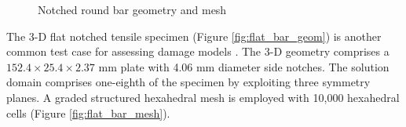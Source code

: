 \documentclass[sn-mathphys,Numbered]{sn-jnl}%
\begin{document}
\begin{figure}[htbp]
	\centering
		 \quad
		
		
		\caption{Notched round bar geometry and mesh}
	\label{fig:notched_bar_geom_mesh}
\end{figure}


The 3-D flat notched tensile specimen (Figure \ref{fig:flat_bar_geom}) is another common test case for assessing damage models \citep{borden_phase-field_2016, eldahshan_phase_2021}.
The 3-D geometry comprises a $152.4 \times 25.4 \times 2.37$ mm plate with 4.06 mm diameter side notches.
The solution domain comprises one-eighth of the specimen by exploiting three symmetry planes.
A graded structured hexahedral mesh is employed with 10,000 hexahedral cells (Figure \ref{fig:flat_bar_mesh}).
\end{document}
